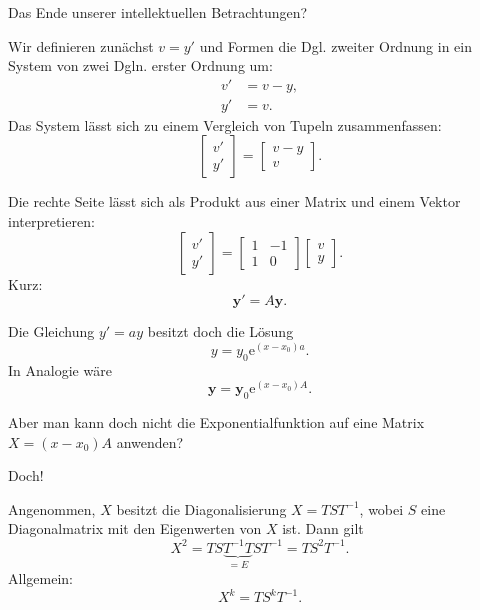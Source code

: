 \documentclass{beamer}
\newcommand{\ee}{\mathrm e}
\begin{document}
\begin{frame}
Das Ende unserer intellektuellen Betrachtungen? 
\end{frame}

\begin{frame}
Wir definieren zunächst $v=y'$ und Formen die Dgl. zweiter Ordnung
in ein System von zwei Dgln. erster Ordnung um:
\begin{align*}
v'&=v-y,\\
y'&=v.
\end{align*}
Das System lässt sich zu einem Vergleich von Tupeln zusammenfassen:
\[\begin{bmatrix}
v'\\
y'
\end{bmatrix}
= \begin{bmatrix}
v-y\\
v
\end{bmatrix}.\]
\end{frame}

\begin{frame}
Die rechte Seite lässt sich als Produkt aus einer Matrix und
einem Vektor interpretieren:
\[\begin{bmatrix}
v'\\
y'
\end{bmatrix}
= \begin{bmatrix}
1 & -1\\
1 & 0
\end{bmatrix}
\begin{bmatrix}
v\\
y
\end{bmatrix}.\]
Kurz:
\[\mathbf y' = A\mathbf y.\]
\end{frame}

\begin{frame}
Die Gleichung $y'=ay$ besitzt doch die
Lösung
\[y=y_0\ee^{(x-x_0)a}.\]
In Analogie wäre
\[\mathbf y=\mathbf y_0\ee^{(x-x_0)A}.\]
\end{frame}

\begin{frame}
Aber man kann doch nicht die Exponentialfunktion
auf eine Matrix $X=(x-x_0)A$ anwenden?
\end{frame}

\begin{frame}
Doch!
\end{frame}

\begin{frame}
Angenommen, $X$ besitzt die Diagonalisierung $X=TST^{-1}$, wobei
$S$ eine Diagonalmatrix mit den Eigenwerten von $X$ ist. Dann
gilt
\[X^2 = TS\underbrace{T^{-1}T}_{=E}ST^{-1} = TS^2T^{-1}.\]
Allgemein:
\[X^k = TS^k T^{-1}.\]
\end{frame}
\end{document}
